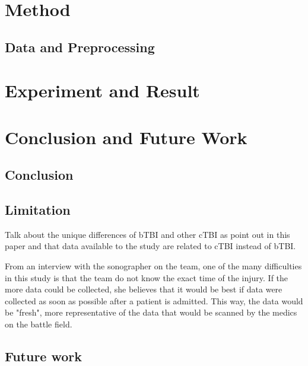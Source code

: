 \documentclass [11pt, proquest] {uwthesis}[2020/02/24]
\begin{document}

\chapter {Method}

\section{Data and Preprocessing}







\chapter {Experiment and Result}





\chapter {Conclusion and Future Work}

\section{Conclusion}



\section{Limitation}
Talk about the unique differences of bTBI and other cTBI as point out in this 
paper \cite{explosive} and that data available to the study are related to 
cTBI instead of bTBI.

From an interview with the sonographer on the team, one of the many difficulties in this
study is that the team do not know the exact time of the injury. If the more data could be
collected, she believes that it would be best if data were collected as soon as possible after
a patient is admitted. This way, the data would be "fresh", more representative of the data that
would be scanned by the medics on the battle field.


\section{Future work}
\end{document}
